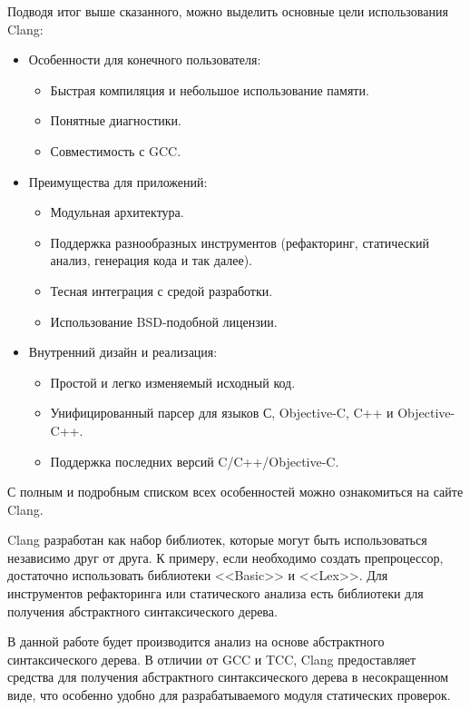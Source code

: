 Подводя итог выше сказанного, можно выделить основные цели использования Clang:
\begin{itemize}
\item Особенности для конечного пользователя:
\begin{itemize}
\item Быстрая компиляция и небольшое использование памяти.
\item Понятные диагностики.
\item Совместимость с GCC.
\end{itemize}

\item Преимущества для приложений:
\begin{itemize}
\item Модульная архитектура.
\item Поддержка разнообразных инструментов (рефакторинг, статический анализ, генерация кода и так далее).
\item Тесная интеграция с средой разработки.
\item Использование BSD-подобной лицензии.
\end{itemize}

\item Внутренний дизайн и реализация:
\begin{itemize}
\item Простой и легко изменяемый исходный код.
\item Унифицированный парсер для языков С, Objective-C, C++ и Objective-C++.
\item Поддержка последних версий C/C++/Objective-C.
\end{itemize}
\end{itemize}

С полным и подробным списком всех особенностей можно ознакомиться на сайте Clang\cite{clangFea}.

Clang разработан как набор библиотек, которые могут быть использоваться независимо друг от друга. 
К примеру, если необходимо создать препроцессор, достаточно использовать библиотеки <<Basic>> и <<Lex>>.
Для инструментов рефакторинга или статического анализа есть библиотеки для получения абстрактного синтаксического 
дерева. 

В данной работе будет производится анализ на основе абстрактного синтаксического дерева. 
В отличии от GCC и TCC, Clang предоставляет средства для получения абстрактного синтаксического
дерева в несокращенном виде, что особенно удобно для разрабатываемого модуля статических проверок.  

